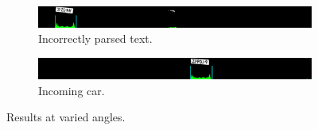 \begin{figure}[ht]
        \centering
        \begin{subfigure}{\textwidth}
            \includegraphics[width=\textwidth]{plaatjes/85-offset-1}
            \caption{Incorrectly parsed text.}
            \label{fig:different-height-band-1}
        \end{subfigure}%

        \begin{subfigure}{\textwidth}
            \includegraphics[width=\textwidth]{plaatjes/85-offset-2}
            \caption{Incoming car.}
            \label{fig:different-height-band-2}
        \end{subfigure}%

        \caption{Results at varied angles.}
        \label{fig:different-height-bands}
\end{figure}%

